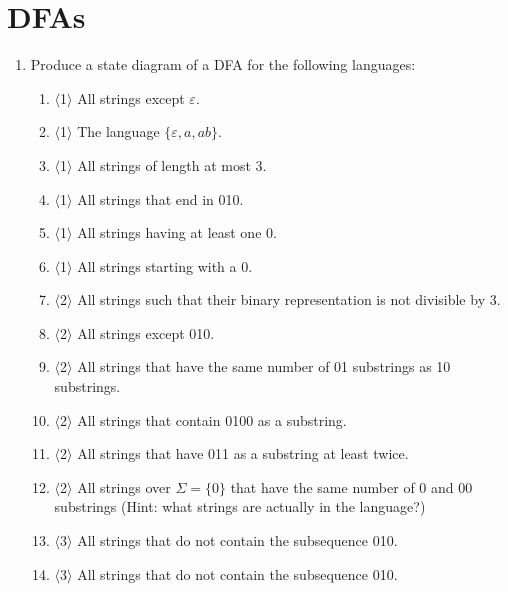 \documentclass[a4paper,american,12pt]{book}
\newcommand{\Level}[1]{{\color{blue} $\langle$#1$\rangle$}}
\begin{document}
\section{DFAs}
\begin{enumerate}
\item Produce a state diagram of a DFA for the following languages:
\begin{enumerate} 

\item \Level{1} All strings except $\varepsilon$.

\item \Level{1} The language $\{\varepsilon, a, ab\}$.

\item \Level{1} All strings of length at most 3.

\item \Level{1} All strings that end in 010.

\item \label{ex2017prod1} \Level{1} All strings having at least one 0.

\item \label{ex2017fprod1} \Level{1} All strings starting with a 0.

\item \label{ex2017prod2} \Level{2} All strings such that their binary representation is not divisible by 3.

\item \Level{2} All strings except 010.

\item \Level{2} All strings that have the same number of 01 substrings as 10 substrings.

\item \Level{2} All strings that contain 0100 as a substring.

\item \Level{2} All strings that have 011 as a substring at least twice.

\item \Level{2} All strings over $\Sigma = \{0\}$ that have the same number of 0 and 00 substrings (Hint: what strings are actually in the language?)

\item \label{ex2017fprod2} \Level{3}  All strings that do not contain the subsequence 010.

\item \Level{3} All strings that do not contain the subsequence 010.

\end{enumerate}


\end{enumerate}
\end{document}
